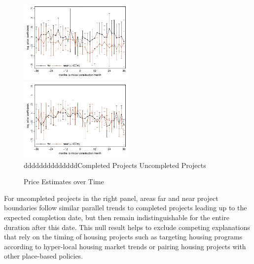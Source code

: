 \documentclass[12pt]{article}
\begin{document}
\begin{figure}
\caption{Price Estimates over Time}\label{figure:timeplot}
\includegraphics[width=0.5\textwidth,trim={.77cm 0cm .21cm 0cm}]{figures/timeplot.pdf}
   \hfill
\includegraphics[width=0.5\textwidth,trim={.77cm 0cm .21cm 0cm},clip]{figures/timeplot_placebo.pdf}\\
{\color{white}dddddddddddddd}Completed Projects \hspace{4.2cm} Uncompleted Projects
\end{figure}

For uncompleted projects in the right panel, areas far and near project boundaries follow similar parallel trends to completed projects leading up to the expected completion date, but then remain indistinguishable for the entire duration after this date.  This null result helps to exclude competing explanations that rely on the timing of housing projects such as targeting housing programs according to hyper-local housing market trends or pairing housing projects with other place-based policies.  
\end{document}
